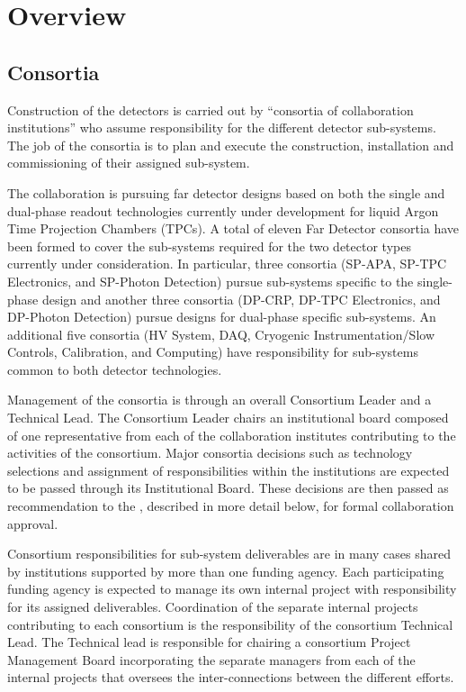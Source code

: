 \chapter{Overview}
\label{vl:tc-overview}

\section{Consortia}
\label{sec:consortia}

Construction of the  detectors is carried out by “consortia of
collaboration institutions” who assume responsibility for the
different detector sub-systems.  The job of the consortia is to plan
and execute the construction, installation and commissioning of their
assigned sub-system.

The  collaboration is pursuing far detector designs based on both
the single and dual-phase readout technologies currently under
development for liquid Argon Time Projection Chambers (TPCs).  A total
of eleven Far Detector consortia have been formed to cover the
sub-systems required for the two detector types currently under
consideration.  In particular, three consortia (SP-APA, SP-TPC
Electronics, and SP-Photon Detection) pursue sub-systems specific to
the single-phase design and another three consortia (DP-CRP, DP-TPC
Electronics, and DP-Photon Detection) pursue designs for dual-phase
specific sub-systems.  An additional five consortia (HV System, DAQ,
Cryogenic Instrumentation/Slow Controls, Calibration, and Computing)
have responsibility for sub-systems common to both detector
technologies.

Management of the consortia is through an overall Consortium Leader
and a Technical Lead.  The Consortium Leader chairs an institutional
board composed of one representative from each of the collaboration
institutes contributing to the activities of the consortium.  Major
consortia decisions such as technology selections and assignment of
responsibilities within the institutions are expected to be passed
through its Institutional Board.  These decisions are then passed as
recommendation to the  , described in more detail
below, for formal collaboration approval.

Consortium responsibilities for sub-system deliverables are in many
cases shared by institutions supported by more than one funding
agency.  Each participating funding agency is expected to manage its
own internal project with responsibility for its assigned
deliverables.  Coordination of the separate internal projects
contributing to each consortium is the responsibility of the
consortium Technical Lead.  The Technical lead is responsible for
chairing a consortium Project Management Board incorporating the
separate managers from each of the internal projects that oversees the
inter-connections between the different efforts.

